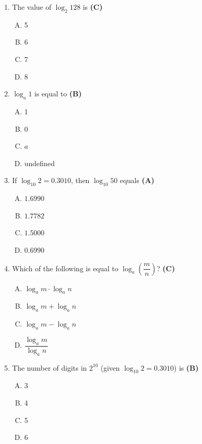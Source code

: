 \documentclass[10pt,a4paper]{article}
\begin{document}
\begin{enumerate}[1.]

\item The value of $\log_2 128$ is \hfill \textbf{(C)}
\begin{enumerate}[(A)]
    \item 5
    \item 6
    \item 7
    \item 8
\end{enumerate}

\item $\log_a 1$ is equal to \hfill \textbf{(B)}
\begin{enumerate}[(A)]
    \item 1
    \item 0
    \item $a$
    \item undefined
\end{enumerate}

\item If $\log_{10} 2 = 0.3010$, then $\log_{10} 50$ equals \hfill \textbf{(A)}
\begin{enumerate}[(A)]
    \item $1.6990$
    \item $1.7782$
    \item $1.5000$
    \item $0.6990$
\end{enumerate}

\item Which of the following is equal to $\log_a\!\left(\dfrac{m}{n}\right)$? \hfill \textbf{(C)}
\begin{enumerate}[(A)]
    \item $\log_a m \cdot \log_a n$
    \item $\log_a m + \log_a n$
    \item $\log_a m - \log_a n$
    \item $\dfrac{\log_a m}{\log_a n}$
\end{enumerate}

\item The number of digits in $2^{10}$ (given $\log_{10} 2 = 0.3010$) is \hfill \textbf{(B)}
\begin{enumerate}[(A)]
    \item 3
    \item 4
    \item 5
    \item 6
\end{enumerate}


\end{enumerate}
\end{document}
